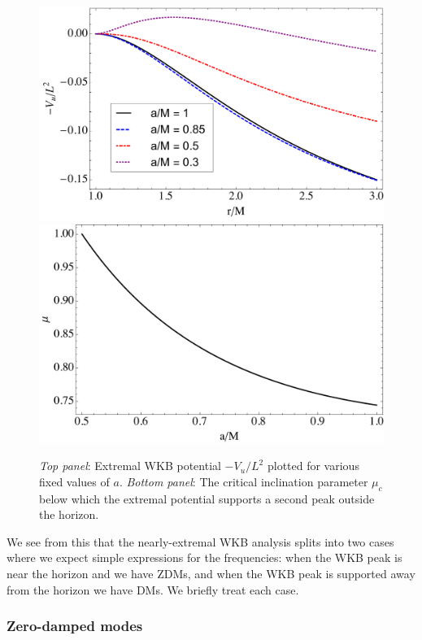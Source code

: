 \begin{refsection}
\begin{figure}[tb]
\includegraphics[width = 1.0 \columnwidth]{chapter_extremal/etc/KNEqExPotential}
\includegraphics[width = 1.0 \columnwidth]{chapter_extremal/etc/KNCritMu}
\caption{{\it Top panel}: Extremal WKB potential $-V_u/L^2$ plotted for various fixed values of $a$. {\it Bottom panel}: The critical inclination parameter $\mu_c$ below which the extremal potential supports a second peak outside the horizon.}
\label{fig:CritMu}
\end{figure}

We see from this that the nearly-extremal WKB analysis splits into two cases where we expect simple expressions for the frequencies: when the WKB peak is near the horizon and we have ZDMs, and when the WKB peak is supported away from the horizon we have DMs. We briefly treat each case.


\subsubsection{Zero-damped modes}


\end{refsection}
